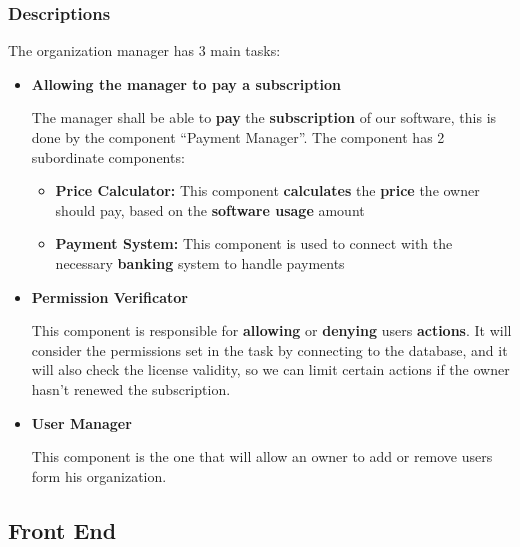 \documentclass{article}
\begin{document}
\subsubsection{Descriptions}

The organization manager has 3 main tasks:
\begin{itemize}
    \item \textbf{Allowing the manager to pay a subscription}

    The manager shall be able to \textbf{pay} the \textbf{subscription} of our software, this is done by the component ``Payment Manager''.
    The component has 2 subordinate components:
    \begin{itemize}
        \item \textbf{Price Calculator: } This component \textbf{calculates} the \textbf{price} the owner should pay, based on the \textbf{software usage} amount
        \item \textbf{Payment System: } This component is used to connect with the necessary \textbf{banking} system to handle payments
    \end{itemize}

    \item \textbf{Permission Verificator}

    This component is responsible for \textbf{allowing} or \textbf{denying} users \textbf{actions}. It will consider the permissions set in the task by connecting to the database,
    and it will also check the license validity, so we can limit certain actions if the owner hasn't renewed the subscription.

    \item \textbf{User Manager}
    
    This component is the one that will allow an owner to add or remove users form his organization.
\end{itemize}


\subsection{Front End}
\end{document}
